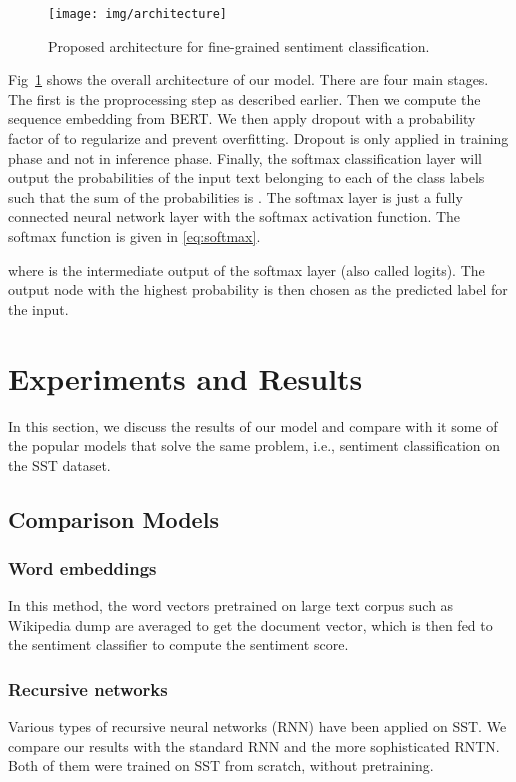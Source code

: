 \documentclass[conference]{IEEEtran}
\begin{document}
\begin{figure}[ht]
    \centering
    \texttt{[image: img/architecture]}
    \caption{Proposed architecture for fine-grained sentiment classification.}
    \label{fig:architecture}
\end{figure}

Fig~\ref{fig:architecture} shows the overall architecture of our model. There are four main stages. The first is the proprocessing step as described earlier. Then we compute the sequence embedding from BERT. We then apply dropout with a probability factor of  to regularize and prevent overfitting. Dropout is only applied in training phase and not in inference phase. Finally, the softmax classification layer will output the probabilities of the input text belonging to each of the class labels such that the sum of the probabilities is . The softmax layer is just a fully connected neural network layer with the softmax activation function. The softmax function  is given in \eqref{eq:softmax}.

where  is the intermediate output of the softmax layer (also called logits). The output node with the highest probability is then chosen as the predicted label for the input. \section{Experiments and Results}\label{sec:result}

In this section, we discuss the results of our model and compare with it some of the popular models that solve the same problem, i.e., sentiment classification on the SST dataset.

\subsection{Comparison Models}





\subsubsection{Word embeddings}
In this method, the word vectors pretrained on large text corpus such as Wikipedia dump are averaged to get the document vector, which is then fed to the sentiment classifier to compute the sentiment score.





\subsubsection{Recursive networks}
Various types of recursive neural networks (RNN) have been applied on SST\cite{rntn}. We compare our results with the standard RNN and the more sophisticated RNTN. Both of them were trained on SST from scratch, without pretraining.
\end{document}
